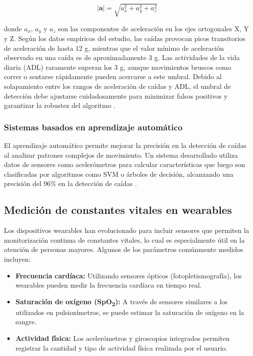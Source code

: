 \documentclass[12pt, a4paper]{article}
\begin{document}
	\[
	|\mathbf{a}| = \sqrt{a_x^2 + a_y^2 + a_z^2}
	\]
	
	donde \(a_x\), \(a_y\) y \(a_z\) son las componentes de aceleración en los ejes ortogonales X, Y y Z. Según los datos empíricos del estudio, las caídas provocan picos transitorios de aceleración de hasta 12 g, mientras que el valor mínimo de aceleración observado en una caída es de aproximadamente 3 g. Las actividades de la vida diaria (ADL) raramente superan los 3 g, aunque movimientos bruscos como correr o sentarse rápidamente pueden acercarse a este umbral. Debido al solapamiento entre los rangos de aceleración de caídas y ADL, el umbral de detección debe ajustarse cuidadosamente para minimizar falsos positivos y garantizar la robustez del algoritmo \cite{ucm2015}.
	
	\subsubsection{Sistemas basados en aprendizaje automático}
	
	El aprendizaje automático permite mejorar la precisión en la detección de caídas al analizar patrones complejos de movimiento. Un sistema desarrollado utiliza datos de sensores como acelerómetros para calcular características que luego son clasificadas por algoritmos como SVM o árboles de decisión, alcanzando una precisión del 96\% en la detección de caídas \cite{lauro2021}.
	
	
	\subsection{Medición de constantes vitales en wearables}
	
	Los dispositivos wearables han evolucionado para incluir sensores que permiten la monitorización continua de constantes vitales, lo cual es especialmente útil en la atención de personas mayores. Algunos de los parámetros comúnmente medidos incluyen:
	
	\begin{itemize}
		\item \textbf{Frecuencia cardíaca:} Utilizando sensores ópticos (fotopletismografía), los wearables pueden medir la frecuencia cardíaca en tiempo real.
		\item \textbf{Saturación de oxígeno (SpO\textsubscript{2}):} A través de sensores similares a los utilizados en pulsioxímetros, se puede estimar la saturación de oxígeno en la sangre.
		\item \textbf{Actividad física:} Los acelerómetros y giroscopios integrados permiten registrar la cantidad y tipo de actividad física realizada por el usuario.
	\end{itemize}
	
\end{document}
